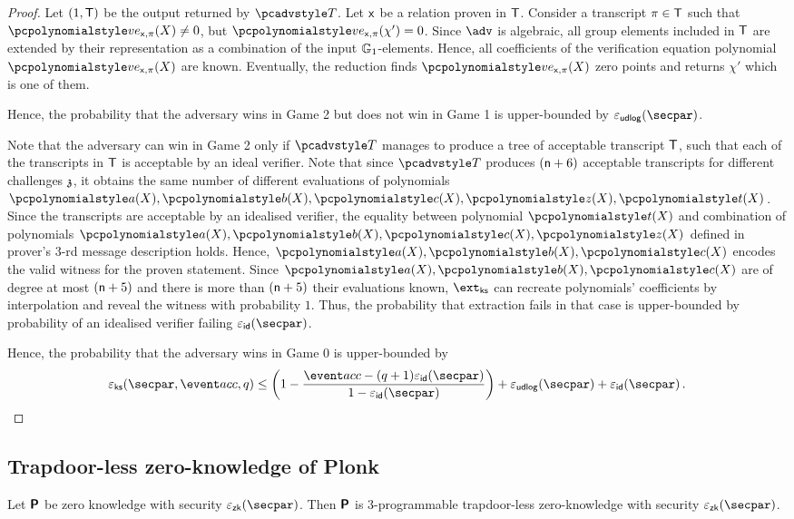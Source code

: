 \begin{proof}
  Let $(1, \mathsf{T})$ be the output returned by $\tdv$. Let $\mathsf{x}$ be a relation proven in $\mathsf{T}$.  Consider a transcript $\pi \in \mathsf{T}$ such that $\vereq_{\inp, \zkproof}(X) \neq 0$, but $\vereq_{\inp, \zkproof}(\chi') = 0$. Since $\adv$ is algebraic, all group elements included in $\mathsf{T}$ are extended by their representation as a combination of the input $\mathbb{G}_1$-elements. Hence, all coefficients of the verification equation polynomial $\vereq_{\inp, \zkproof}(X)$ are known. 
  Eventually, the reduction finds $\vereq_{\inp, \zkproof}(X)$ zero points and returns $\chi'$ which is one of them.
    
  Hence, the probability that the adversary wins in Game 2 but does not win in Game 1 is upper-bounded by $\epsudlog (\secpar)$.

  Note that the adversary can win in Game 2 only if $\tdv$ manages to produce a tree of acceptable transcript $\mathsf{T}$, such that each of the transcripts in $\mathsf{T}$ is acceptable by an ideal verifier. Note that since $\tdv$ produces $(\mathsf{n} + 6)$ acceptable transcripts for different challenges $\mathfrak{z}$, it obtains the same number of different evaluations of polynomials $\p{a} (X), \p{b} (X), \p{c} (X), \p{z} (X), \p{t} (X)$. Since the transcripts are acceptable by an idealised verifier, the equality between polynomial $\p{t} (X)$ and combination of polynomials $\p{a} (X), \p{b} (X), \p{c} (X), \p{z} (X)$ defined in prover's $3$-rd message description holds. Hence, $\p{a} (X), \p{b} (X), \p{c} (X)$ encodes the valid witness for the proven statement. Since $\p{a} (X), \p{b} (X), \p{c} (X)$ are of degree at most $(\mathsf{n} + 5)$ and there is more than $(\mathsf{n} + 5)$ their evaluations known, $\extcss$ can recreate polynomials' coefficients by interpolation and reveal the witness with probability $1$. Thus, the probability that extraction fails in that case is upper-bounded by probability of an idealised verifier failing $\epsid(\secpar)$.

  Hence, the probability that the adversary wins in Game 0 is upper-bounded by 
  \[
    \epscss(\secpar,\accProb, q) \leq \left(1 - \frac{\accProb - (q + 1) \epsid (\secpar)}{1 - \epsid (\secpar)}\right) + \epsudlog (\secpar) + \epsid (\secpar)\,. 
  \]
 \end{proof}
  

\subsection{Trapdoor-less zero-knowledge of Plonk}
\begin{lemma}
  \label{lem:plonk_tlzk}
  Let $\bm{\mathsf{P}}$ be zero knowledge with security $\epszk(\secpar)$. Then $\bm{\mathsf{P}}$ is 3-programmable trapdoor-less zero-knowledge
  with security $\epszk(\secpar)$.
\end{lemma}

